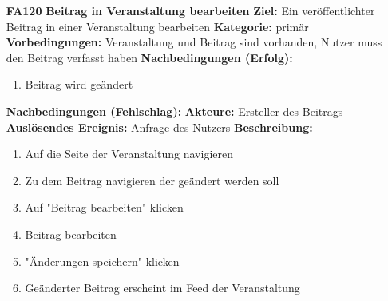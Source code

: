 \documentclass[parskip=full]{scrartcl}
\begin{document}
\begin{itemize}[nosep]
			\item[\textbf{FA120}]\textbf{Beitrag in Veranstaltung bearbeiten}	
			\newline \textbf{Ziel:} Ein veröffentlichter Beitrag in einer Veranstaltung bearbeiten
			\newline \textbf{Kategorie:} primär
			\newline \textbf{Vorbedingungen:} Veranstaltung und Beitrag sind vorhanden, Nutzer muss den Beitrag verfasst haben
			\newline \textbf{Nachbedingungen (Erfolg):} 
			\begin{enumerate}[nosep]
				\item Beitrag wird geändert 
			\end{enumerate}
			\textbf{Nachbedingungen (Fehlschlag):}
			\newline \textbf{Akteure:} Ersteller des Beitrags
			\newline \textbf{Auslösendes Ereignis:} Anfrage des Nutzers
			\newline \textbf{Beschreibung:}
			\begin{enumerate}[nosep]
				\item Auf die Seite der Veranstaltung navigieren
				\item Zu dem Beitrag navigieren der geändert werden soll
				\item Auf "Beitrag bearbeiten" klicken
				\item Beitrag bearbeiten
				\item "Änderungen speichern" klicken
				\item Geänderter Beitrag erscheint im Feed der Veranstaltung\\
			\end{enumerate}
						


							
		\end{itemize}
		
\end{document}
